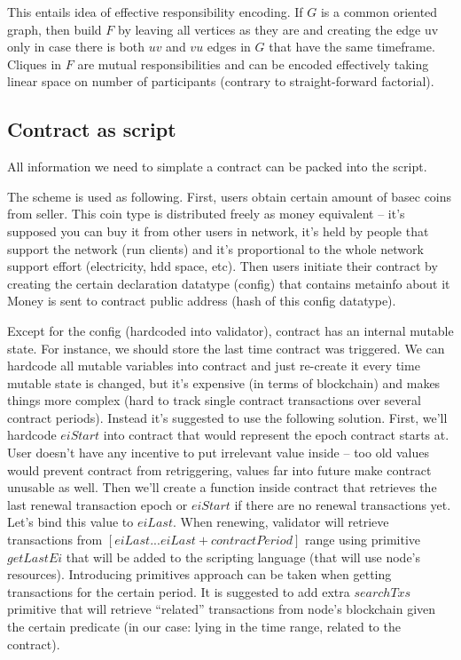 \documentclass[]{itmo-student-thesis}
\begin{document}
This entails idea of effective responsibility encoding. If $G$ is a
common oriented graph, then build $F$ by leaving all vertices as they
are and creating the edge uv only in case there is both $uv$ and $vu$
edges in $G$ that have the same timeframe. Cliques in $F$ are mutual
responsibilities and can be encoded effectively taking linear space on
number of participants (contrary to straight-forward factorial).

\subsection{Contract as script}

All information we need to simplate a contract can be packed into the
script.

The scheme is used as following. First, users obtain certain amount of
basec coins from seller. This coin type is distributed freely as money
equivalent -- it’s supposed you can buy it from other users in
network, it’s held by people that support the network (run clients)
and it’s proportional to the whole network support effort
(electricity, hdd space, etc). Then users initiate their contract by
creating the certain declaration datatype (config) that contains
metainfo about it Money is sent to contract public address (hash of
this config datatype).

Except for the config (hardcoded into validator), contract has an
internal mutable state. For instance, we should store the last time
contract was triggered. We can hardcode all mutable variables into
contract and just re-create it every time mutable state is changed,
but it’s expensive (in terms of blockchain) and makes things more
complex (hard to track single contract transactions over several
contract periods). Instead it’s suggested to use the following
solution. First, we’ll hardcode $eiStart$ into contract that would
represent the epoch contract starts at. User doesn’t have any
incentive to put irrelevant value inside -- too old values would
prevent contract from retriggering, values far into future make
contract unusable as well. Then we’ll create a function inside
contract that retrieves the last renewal transaction epoch or
$eiStart$ if there are no renewal transactions yet. Let’s bind this
value to $eiLast$. When renewing, validator will retrieve transactions
from $[eiLast...eiLast+contractPeriod]$ range using primitive
$getLastEi$ that will be added to the scripting language (that will
use node’s resources). Introducing primitives approach can be taken
when getting transactions for the certain period. It is suggested to
add extra $searchTxs$ primitive that will retrieve “related”
transactions from node’s blockchain given the certain predicate (in
our case: lying in the time range, related to the contract).
\end{document}
